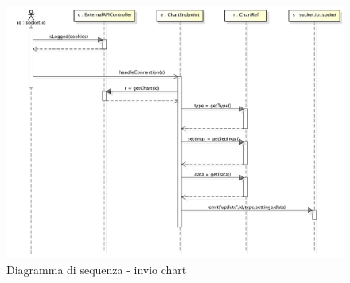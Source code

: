             
            \begin{figure}[H]
                \centering
                \includegraphics[scale=0.3]{DefinizioneDiProdotto/Pics/InvioChart}
                \caption{Diagramma di sequenza - invio chart}
            \end{figure}